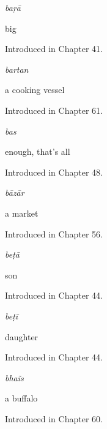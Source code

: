 \noindent\begin{minipage}[t]{\linewidth}
\raggedright
\textbf{}\enspace\emph{baṛā}\par
\small big\par
\footnotesize Introduced in Chapter 41.
\end{minipage}\par\medskip

\noindent\begin{minipage}[t]{\linewidth}
\raggedright
\textbf{}\enspace\emph{bartan}\par
\small a cooking vessel\par
\footnotesize Introduced in Chapter 61.
\end{minipage}\par\medskip

\noindent\begin{minipage}[t]{\linewidth}
\raggedright
\textbf{}\enspace\emph{bas}\par
\small enough, that's all\par
\footnotesize Introduced in Chapter 48.
\end{minipage}\par\medskip

\noindent\begin{minipage}[t]{\linewidth}
\raggedright
\textbf{}\enspace\emph{bāzār}\par
\small a market\par
\footnotesize Introduced in Chapter 56.
\end{minipage}\par\medskip

\noindent\begin{minipage}[t]{\linewidth}
\raggedright
\textbf{}\enspace\emph{beṭā}\par
\small son\par
\footnotesize Introduced in Chapter 44.
\end{minipage}\par\medskip

\noindent\begin{minipage}[t]{\linewidth}
\raggedright
\textbf{}\enspace\emph{beṭī}\par
\small daughter\par
\footnotesize Introduced in Chapter 44.
\end{minipage}\par\medskip

\noindent\begin{minipage}[t]{\linewidth}
\raggedright
\textbf{}\enspace\emph{bhaĩs}\par
\small a buffalo\par
\footnotesize Introduced in Chapter 60.
\end{minipage}\par\medskip

